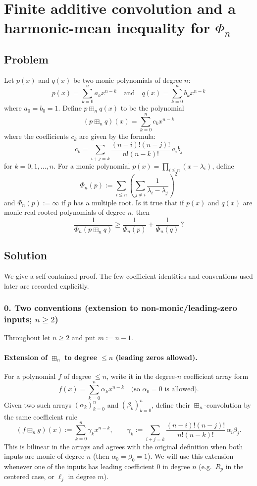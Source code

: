 \documentclass{article}
\title{}
\date{}
\begin{document}
\section{Finite additive convolution and a harmonic-mean inequality for $\Phi_n$}

\subsection*{Problem}

Let $p(x)$ and $q(x)$ be two monic polynomials of degree $n$:
\[
  p(x) = \sum_{k=0}^{n} a_k x^{n-k} \quad \text{and} \quad q(x) = \sum_{k=0}^{n} b_k x^{n-k}
\]
where $a_0 = b_0 = 1$. Define $p \boxplus_n q(x)$ to be the polynomial
\[
  (p \boxplus_n q)(x) = \sum_{k=0}^{n} c_k x^{n-k}
\]
where the coefficients $c_k$ are given by the formula:
\[
  c_k = \sum_{i+j=k} \frac{(n-i)!(n-j)!}{n!(n-k)!}\, a_i b_j
\]
for $k = 0, 1, \ldots, n$. For a monic polynomial $p(x) = \prod_{i \le n}(x - \lambda_i)$, define
\[
  \Phi_n(p) := \sum_{i \le n} \left(\sum_{j \neq i} \frac{1}{\lambda_i - \lambda_j}\right)^{\!2}
\]
and $\Phi_n(p) := \infty$ if $p$ has a multiple root. Is it true that if $p(x)$ and $q(x)$ are monic real-rooted polynomials of degree $n$, then
\[
  \frac{1}{\Phi_n(p \boxplus_n q)} \ge \frac{1}{\Phi_n(p)} + \frac{1}{\Phi_n(q)}\,?
\]

\subsection*{Solution}

We give a self-contained proof. The few coefficient identities and conventions used later are
recorded explicitly.

\subsubsection*{0. Two conventions (extension to non-monic/leading-zero inputs; $n \ge 2$)}

Throughout let $n \ge 2$ and put $m := n-1$.

\paragraph{Extension of $\boxplus_n$ to degree $\le n$ (leading zeros allowed).}
For a polynomial $f$ of degree $\le n$, write it in the degree-$n$ coefficient array form
\[
  f(x) = \sum_{k=0}^{n} \alpha_k x^{n-k} \quad \text{(so $\alpha_0 = 0$ is allowed).}
\]
Given two such arrays $(\alpha_k)_{k=0}^n$ and $(\beta_k)_{k=0}^n$, define their $\boxplus_n$-convolution by the same coefficient rule
\[
  (f \boxplus_n g)(x) := \sum_{k=0}^{n} \gamma_k x^{n-k}, \qquad
  \gamma_k := \sum_{i+j=k} \frac{(n-i)!(n-j)!}{n!(n-k)!}\,\alpha_i \beta_j.
\]
This is bilinear in the arrays and agrees with the original definition when both inputs are monic of degree $n$ (then $\alpha_0 = \beta_0 = 1$). We will use this extension whenever one of the inputs has leading coefficient $0$ in degree $n$ (e.g.\ $R_p$ in the centered case, or $\ell_j$ in degree $m$).
\end{document}
